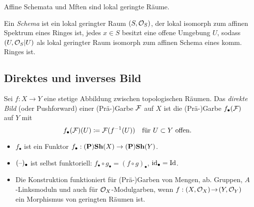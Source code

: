 \documentclass{cheat-sheet}
\begin{document}
\begin{bspe}
  Affine Schemata und Mften sind lokal geringte Räume.
\end{bspe}


\begin{defn}
  Ein \emph{Schema} ist ein lokal geringter Raum $(S, \mathcal{O}_S)$, der lokal isomorph zum affinen Spektrum eines Ringes ist, \dh{} jedes $x \in S$ besitzt eine offene Umgebung $U$, sodass $(U, \mathcal{O}_S|U)$ als lokal geringter Raum isomorph zum affinen Schema eines komm. Ringes ist.
\end{defn}


\subsection{Direktes und inverses Bild}

\begin{defn}
  Sei $f : X \to Y$ eine stetige Abbildung zwischen topologischen Räumen.
  Das \emph{direkte Bild} (oder Pushforward) einer (Prä-)Garbe $\mathcal{F}$ auf $X$ ist die (Prä-)Garbe $f_\bullet(\mathcal{F})$ auf $Y$ mit
  \[
    f_\bullet(\mathcal{F})(U) \coloneqq \mathcal{F}(f^{-1}(U)) \quad
    \text{für $U \subset Y$ offen}.
  \]
\end{defn}

\begin{bem}
  \begin{itemize}
    \item $f_\bullet$ ist ein Funktor $f_\bullet : (\mathbf{P})\mathbf{Sh}(X) \to (\mathbf{P})\mathbf{Sh}(Y)$.
    \item $(\text{--})_\bullet$ ist selbst funktoriell: $f_\bullet \circ g_\bullet = (f \circ g)_\bullet$, $\operatorname{id}_\bullet = \operatorname{Id}$.
    \item Die Konstruktion funktioniert für (Prä-)Garben von Mengen, ab. Gruppen, $A$-Linksmoduln und auch für $\mathcal{O}_X$-Modulgarben, wenn $f : (X, \mathcal{O}_X) \!\to\! (Y, \mathcal{O}_Y)$ ein Morphismus von geringten Räumen ist.
  \end{itemize}
\end{bem}

\end{document}
